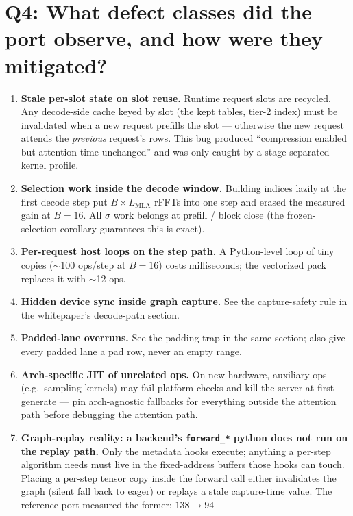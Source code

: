 \documentclass[11pt]{article}
\begin{document}
\section{Q4: What defect classes did the port observe, and how were they
mitigated?}

\begin{enumerate}[itemsep=2pt]
\item \textbf{Stale per-slot state on slot reuse.} Runtime request slots are
recycled. Any decode-side cache keyed by slot (the kept tables, tier-2
index) must be invalidated when a new request prefills the slot ---
otherwise the new request attends the \emph{previous} request's rows. This
bug produced ``compression enabled but attention time unchanged'' and was
only caught by a stage-separated kernel profile.
\item \textbf{Selection work inside the decode window.} Building indices
lazily at the first decode step put $B \times L_{\mathrm{MLA}}$ rFFTs into
one step and erased the measured gain at $B{=}16$. All $\sigma$ work belongs
at prefill / block close (the frozen-selection corollary guarantees this is
exact).
\item \textbf{Per-request host loops on the step path.} A Python-level loop
of tiny copies ($\sim$100 ops/step at $B{=}16$) costs milliseconds; the
vectorized pack replaces it with $\sim$12 ops.
\item \textbf{Hidden device sync inside graph capture.} See the
capture-safety rule in the whitepaper's decode-path section.
\item \textbf{Padded-lane overruns.} See the padding trap in the same
section; also give every padded lane a pad row, never an empty range.
\item \textbf{Arch-specific JIT of unrelated ops.} On new hardware,
auxiliary ops (e.g.\ sampling kernels) may fail platform checks and kill
the server at first generate --- pin arch-agnostic fallbacks for everything
outside the attention path before debugging the attention path.
\item \textbf{Graph-replay reality: a backend's \texttt{forward\_*} python
does not run on the replay path.} Only the metadata hooks execute; anything
a per-step algorithm needs must live in the fixed-address buffers those
hooks can touch. Placing a per-step tensor copy inside the forward call
either invalidates the graph (silent fall back to eager) or replays a stale
capture-time value. The reference port measured the former: $138 \to 94$

\end{enumerate}
\end{document}
